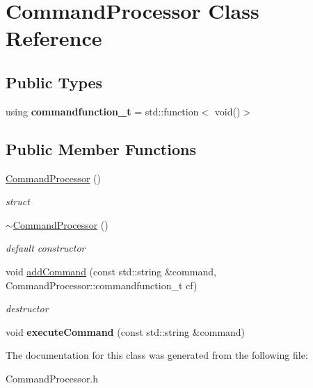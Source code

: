 \hypertarget{classCommandProcessor}{}\section{Command\+Processor Class Reference}
\label{classCommandProcessor}
\subsection*{Public Types}
\begin{DoxyCompactItemize}
\item 
using {\bfseries commandfunction\+\_\+t} = std\+::function$<$ void()$>$\hypertarget{classCommandProcessor_a2593afb28942ab7ced54b135a9dd2002}{}\label{classCommandProcessor_a2593afb28942ab7ced54b135a9dd2002}

\end{DoxyCompactItemize}
\subsection*{Public Member Functions}
\begin{DoxyCompactItemize}
\item 
\hyperlink{classCommandProcessor_a5643028cf10be143aab4e42939b22880}{Command\+Processor} ()\hypertarget{classCommandProcessor_a5643028cf10be143aab4e42939b22880}{}\label{classCommandProcessor_a5643028cf10be143aab4e42939b22880}

\begin{DoxyCompactList}\small\item\em struct \end{DoxyCompactList}\item 
\hyperlink{classCommandProcessor_a8b975af12657aab33323c1b6c5bb2961}{$\sim$\+Command\+Processor} ()\hypertarget{classCommandProcessor_a8b975af12657aab33323c1b6c5bb2961}{}\label{classCommandProcessor_a8b975af12657aab33323c1b6c5bb2961}

\begin{DoxyCompactList}\small\item\em default constructor \end{DoxyCompactList}\item 
void \hyperlink{classCommandProcessor_a1acfe74b76621697eea7d267fec92bd1}{add\+Command} (const std\+::string \&command, Command\+Processor\+::commandfunction\+\_\+t cf)\hypertarget{classCommandProcessor_a1acfe74b76621697eea7d267fec92bd1}{}\label{classCommandProcessor_a1acfe74b76621697eea7d267fec92bd1}

\begin{DoxyCompactList}\small\item\em destructor \end{DoxyCompactList}\item 
void {\bfseries execute\+Command} (const std\+::string \&command)\hypertarget{classCommandProcessor_a3a830f1939e458f31f0cd2d42855609f}{}\label{classCommandProcessor_a3a830f1939e458f31f0cd2d42855609f}

\end{DoxyCompactItemize}


The documentation for this class was generated from the following file\+:\begin{DoxyCompactItemize}
\item 
Command\+Processor.\+h\end{DoxyCompactItemize}

